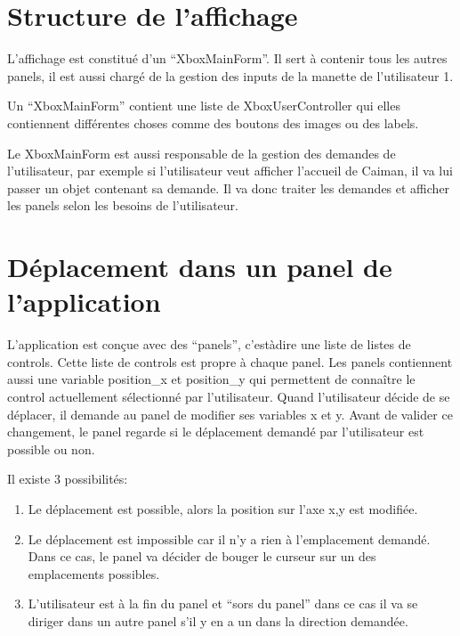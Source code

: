 \documentclass[a4paper,12pt,french]{sphinxmanual}
\begin{document}
\section{Structure de l’affichage}
\label{\detokenize{fonctionnelleInterface:structure-de-laffichage}}
\sphinxAtStartPar
L’affichage est constitué d’un “XboxMainForm”. Il sert à contenir tous les autres panels, il est aussi chargé de la gestion des inputs de la manette de l’utilisateur 1.

\sphinxAtStartPar
Un “XboxMainForm” contient une liste de XboxUserController qui elles contiennent différentes choses comme des boutons des images ou des labels.

\sphinxAtStartPar
Le XboxMainForm est aussi responsable de la gestion des demandes de l’utilisateur, par exemple si l’utilisateur veut afficher l’accueil de Caiman, il va lui passer un objet contenant sa demande. Il va donc traiter les demandes et afficher les panels selon les besoins de l’utilisateur.


\section{Déplacement dans un panel de l’application}
\label{\detokenize{fonctionnelleInterface:deplacement-dans-un-panel-de-lapplication}}
\sphinxAtStartPar
L’application est conçue avec des “panels”, c’est\sphinxhyphen{}à\sphinxhyphen{}dire une liste de listes de controls. Cette liste de controls est propre à chaque panel. Les panels contiennent aussi une variable position\_x et position\_y qui permettent de connaître le control actuellement sélectionné par l’utilisateur. Quand l’utilisateur décide de se déplacer, il demande au panel de modifier ses variables x et y. Avant de valider ce changement, le panel regarde si le déplacement demandé par l’utilisateur est possible ou non.

\sphinxAtStartPar
Il existe 3 possibilités:
\begin{enumerate}
%
\item {} 
\sphinxAtStartPar
Le déplacement est possible, alors la position sur l’axe x,y est modifiée.

\item {} 
\sphinxAtStartPar
Le déplacement est impossible car il n’y a rien à l’emplacement demandé. Dans ce cas, le panel va décider de bouger le curseur sur un des emplacements possibles.

\item {} 
\sphinxAtStartPar
L’utilisateur est à la fin du panel et “sors du panel” dans ce cas il va se diriger dans un autre panel s’il y en a un dans la direction demandée.

\end{enumerate}
\end{document}
